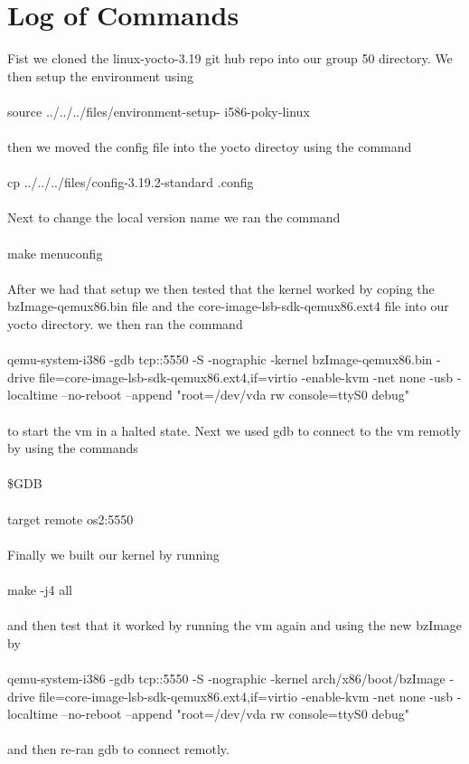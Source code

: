 \documentclass[letterpaper,10pt,titlepage]{article}
\begin{document}
\section{Log of Commands}
Fist we cloned the linux-yocto-3.19 git hub repo into our group 50 directory. 
We then setup the environment using\\\\source ../../../files/environment-setup-
i586-poky-linux\\\\then we moved the config file into the yocto directoy 
using the command\\\\cp ../../../files/config-3.19.2-standard .config\\\\ 
Next to change the local version name we ran the command \\\\make menuconfig\\\\
After we had that setup we then tested that the kernel worked by coping the
bzImage-qemux86.bin file and the core-image-lsb-sdk-qemux86.ext4 file into
our yocto directory. we then ran the command\\\\qemu-system-i386 -gdb tcp::5550
-S -nographic -kernel bzImage-qemux86.bin -drive 
file=core-image-lsb-sdk-qemux86.ext4,if=virtio -enable-kvm -net none -usb 
-localtime --no-reboot --append "root=/dev/vda rw console=ttyS0 debug"\\\\ to 
start the vm in a halted state. Next we used gdb to connect to the vm remotly 
by using the commands\\\\\$GDB\\\\target remote os2:5550\\\\Finally we built our 
kernel by running\\\\make -j4 all\\\\
and then test that it worked by running the vm again and using the new bzImage by\\\\ 
qemu-system-i386 -gdb tcp::5550 -S -nographic -kernel  arch/x86/boot/bzImage 
-drive file=core-image-lsb-sdk-qemux86.ext4,if=virtio -enable-kvm -net none 
-usb -localtime --no-reboot --append "root=/dev/vda rw console=ttyS0 debug"\\\\
and then re-ran gdb to connect remotly.
\end{document}
